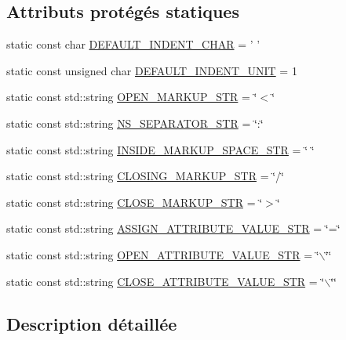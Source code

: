 \subsection*{Attributs protégés statiques}
\begin{DoxyCompactItemize}
\item 
static const char \hyperlink{classxml_1_1_output_visitor_ad61c526a1962865b37f22fdf252b63f3}{DEFAULT\_\-INDENT\_\-CHAR} = ' '
\item 
static const unsigned char \hyperlink{classxml_1_1_output_visitor_aa5e9426f0fdf70d3e0922837c8c99f93}{DEFAULT\_\-INDENT\_\-UNIT} = 1
\item 
static const std::string \hyperlink{classxml_1_1_output_visitor_a3a2a1c7860151f173fd28c0077ffd94a}{OPEN\_\-MARKUP\_\-STR} = \char`\"{}$<$\char`\"{}
\item 
static const std::string \hyperlink{classxml_1_1_output_visitor_a892952bcc6a8b9265c0934cfdc95dd65}{NS\_\-SEPARATOR\_\-STR} = \char`\"{}:\char`\"{}
\item 
static const std::string \hyperlink{classxml_1_1_output_visitor_a67d0548ce8906eb4121d9f33d005c8be}{INSIDE\_\-MARKUP\_\-SPACE\_\-STR} = \char`\"{} \char`\"{}
\item 
static const std::string \hyperlink{classxml_1_1_output_visitor_af06f2eb91d0a40d0d090aeb0bdeb9c9f}{CLOSING\_\-MARKUP\_\-STR} = \char`\"{}/\char`\"{}
\item 
static const std::string \hyperlink{classxml_1_1_output_visitor_aef349142e7de8a309ee5dd048cc5b51f}{CLOSE\_\-MARKUP\_\-STR} = \char`\"{}$>$\char`\"{}
\item 
static const std::string \hyperlink{classxml_1_1_output_visitor_a7eb4bfa043240d8d87fe47eb733057c4}{ASSIGN\_\-ATTRIBUTE\_\-VALUE\_\-STR} = \char`\"{}=\char`\"{}
\item 
static const std::string \hyperlink{classxml_1_1_output_visitor_a16ae3df2d90ed3e57ea51277de609988}{OPEN\_\-ATTRIBUTE\_\-VALUE\_\-STR} = \char`\"{}$\backslash$\char`\"{}\char`\"{}
\item 
static const std::string \hyperlink{classxml_1_1_output_visitor_af3b7b1a653908df91dc19195b3bdb29b}{CLOSE\_\-ATTRIBUTE\_\-VALUE\_\-STR} = \char`\"{}$\backslash$\char`\"{}\char`\"{}
\end{DoxyCompactItemize}


\subsection{Description détaillée}


